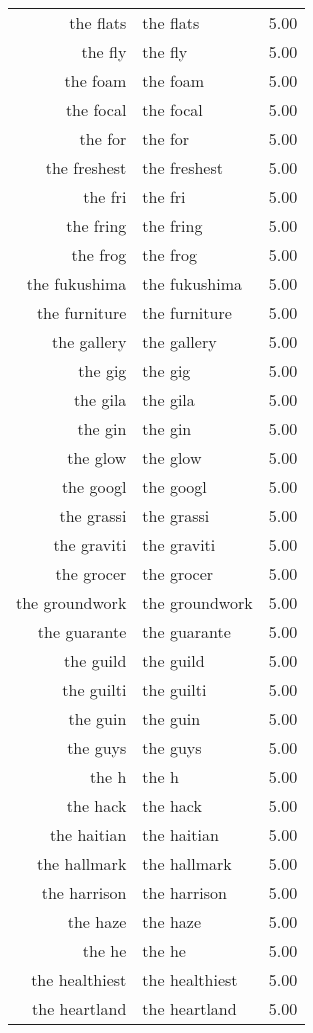 \begin{table}[ht]
\begin{tabular}{rlr}
  the flats & the flats & 5.00 \\ 
  the fly & the fly & 5.00 \\ 
  the foam & the foam & 5.00 \\ 
  the focal & the focal & 5.00 \\ 
  the for & the for & 5.00 \\ 
  the freshest & the freshest & 5.00 \\ 
  the fri & the fri & 5.00 \\ 
  the fring & the fring & 5.00 \\ 
  the frog & the frog & 5.00 \\ 
  the fukushima & the fukushima & 5.00 \\ 
  the furniture & the furniture & 5.00 \\ 
  the gallery & the gallery & 5.00 \\ 
  the gig & the gig & 5.00 \\ 
  the gila & the gila & 5.00 \\ 
  the gin & the gin & 5.00 \\ 
  the glow & the glow & 5.00 \\ 
  the googl & the googl & 5.00 \\ 
  the grassi & the grassi & 5.00 \\ 
  the graviti & the graviti & 5.00 \\ 
  the grocer & the grocer & 5.00 \\ 
  the groundwork & the groundwork & 5.00 \\ 
  the guarante & the guarante & 5.00 \\ 
  the guild & the guild & 5.00 \\ 
  the guilti & the guilti & 5.00 \\ 
  the guin & the guin & 5.00 \\ 
  the guys & the guys & 5.00 \\ 
  the h & the h & 5.00 \\ 
  the hack & the hack & 5.00 \\ 
  the haitian & the haitian & 5.00 \\ 
  the hallmark & the hallmark & 5.00 \\ 
  the harrison & the harrison & 5.00 \\ 
  the haze & the haze & 5.00 \\ 
  the he & the he & 5.00 \\ 
  the healthiest & the healthiest & 5.00 \\ 
  the heartland & the heartland & 5.00 \\ 

\end{tabular}
\end{table}
